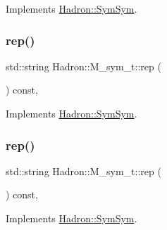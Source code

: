Implements \mbox{\hyperlink{structHadron_1_1SymSym_ae57780f41b9f6c03c6056eed3677bd48}{Hadron\+::\+Sym\+Sym}}.

\mbox{\label{structHadron_1_1M__sym__t_ad90bc816709bb65ec3e0b804090fbefe}} 
\subsubsection{\texorpdfstring{rep()}{rep()}\hspace{0.1cm}{\footnotesize\ttfamily [1/5]}}
{\footnotesize\ttfamily std\+::string Hadron\+::\+M\+\_\+sym\+\_\+t\+::rep (\begin{DoxyParamCaption}{ }\end{DoxyParamCaption}) const\hspace{0.3cm}{\ttfamily [inline]}, {\ttfamily [virtual]}}



Implements \mbox{\hyperlink{structHadron_1_1SymSym_aa6e588740862036933a9efe085a5e5e5}{Hadron\+::\+Sym\+Sym}}.

\mbox{\label{structHadron_1_1M__sym__t_ad90bc816709bb65ec3e0b804090fbefe}} 
\subsubsection{\texorpdfstring{rep()}{rep()}\hspace{0.1cm}{\footnotesize\ttfamily [2/5]}}
{\footnotesize\ttfamily std\+::string Hadron\+::\+M\+\_\+sym\+\_\+t\+::rep (\begin{DoxyParamCaption}{ }\end{DoxyParamCaption}) const\hspace{0.3cm}{\ttfamily [inline]}, {\ttfamily [virtual]}}



Implements \mbox{\hyperlink{structHadron_1_1SymSym_aa6e588740862036933a9efe085a5e5e5}{Hadron\+::\+Sym\+Sym}}.

\mbox{\label{structHadron_1_1M__sym__t_ad90bc816709bb65ec3e0b804090fbefe}} 

